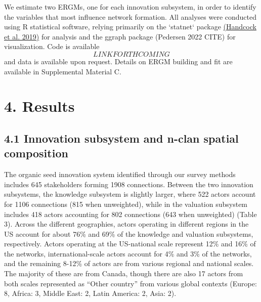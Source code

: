 \documentclass[twoside,12pt,final]{ucthesis-CA2012}
\begin{document}
\begin{ucmainmatter}
We estimate two ERGMs, one for each innovation subsystem, in order to
identify the variables that most influence network formation. All
analyses were conducted using R statistical software, relying primarily
on the `statnet` package \href{https://www.zotero.org/google-docs/?CFTBYJ}{(Handcock et al.
2019)} for analysis and the
\textquotesingle ggraph\textquotesingle{} package (Pedersen 2022 CITE) for visualization. Code is
available \[LINK FORTHCOMING\] and data is available upon request.
Details on ERGM building and fit are available in Supplemental Material
C.

\hypertarget{results-1}{%
\section{4. Results}\label{results-1}}

\hypertarget{innovation-subsystem-and-n-clan-spatial-composition}{%
\subsection{4.1 Innovation subsystem and n-clan spatial composition}\label{innovation-subsystem-and-n-clan-spatial-composition}}

The organic seed innovation system identified through our survey methods
includes 645 stakeholders forming 1908 connections. Between the two
innovation subsystems, the knowledge subsystem is slightly larger, where
522 actors account for 1106 connections (815 when unweighted), while in
the valuation subsystem includes 418 actors accounting for 802
connections (643 when unweighted) (Table 3). Across the different
geographies, actors operating in different regions in the US account for
about 76\% and 69\% of the knowledge and valuation subsystems,
respectively. Actors operating at the US-national scale represent 12\%
and 16\% of the networks, international-scale actors account for 4\% and
3\% of the networks, and the remaining 8-12\% of actors are from various
regional and national scales. The majority of these are from Canada,
though there are also 17 actors from both scales represented as ``Other
country'' from various global contexts (Europe: 8, Africa: 3, Middle
East: 2, Latin America: 2, Asia: 2).
\begin{table}


\end{table}
\end{ucmainmatter}
\end{document}
